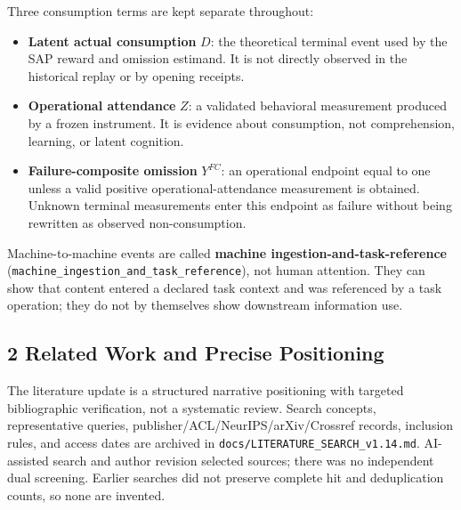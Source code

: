 \documentclass[
  11pt]{article}
\providecommand{\tightlist}{%
  \setlength{\itemsep}{0pt}\setlength{\parskip}{0pt}}
\begin{document}
Three consumption terms are kept separate throughout:

\begin{itemize}
\tightlist
\item
  \textbf{Latent actual consumption} \(D\): the theoretical terminal
  event used by the SAP reward and omission estimand. It is not directly
  observed in the historical replay or by opening receipts.
\item
  \textbf{Operational attendance} \(Z\): a validated behavioral
  measurement produced by a frozen instrument. It is evidence about
  consumption, not comprehension, learning, or latent cognition.
\item
  \textbf{Failure-composite omission} \(Y^{FC}\): an operational
  endpoint equal to one unless a valid positive operational-attendance
  measurement is obtained. Unknown terminal measurements enter this
  endpoint as failure without being rewritten as observed
  non-consumption.
\end{itemize}

Machine-to-machine events are called \textbf{machine
ingestion-and-task-reference}
(\texttt{machine\_ingestion\_and\_task\_reference}), not human
attention. They can show that content entered a declared task context
and was referenced by a task operation; they do not by themselves show
downstream information use.

\subsection{2 Related Work and Precise
Positioning}\label{related-work-and-precise-positioning}

The literature update is a structured narrative positioning with
targeted bibliographic verification, not a systematic review. Search
concepts, representative queries, publisher/ACL/NeurIPS/arXiv/Crossref
records, inclusion rules, and access dates are archived in
\texttt{docs/LITERATURE\_SEARCH\_v1.14.md}. AI-assisted search and
author revision selected sources; there was no independent dual
screening. Earlier searches did not preserve complete hit and
deduplication counts, so none are invented.
\end{document}
